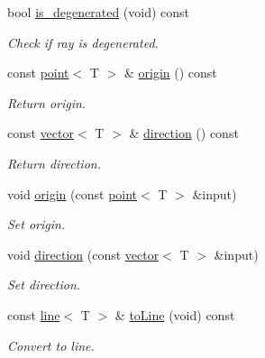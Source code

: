\begin{DoxyCompactItemize}
\mbox{\label{classddd_1_1ray_a1e7177e2e7cf15e8c1ec3a0631f8b583}} 
bool \hyperlink{classddd_1_1ray_a1e7177e2e7cf15e8c1ec3a0631f8b583}{is\+\_\+degenerated} (void) const
\begin{DoxyCompactList}\small\item\em Check if ray is degenerated. \end{DoxyCompactList}\item 
\mbox{\label{classddd_1_1ray_a92ad567ccc11d6d2bb9faa66cefbb9ca}} 
const \hyperlink{classddd_1_1point}{point}$<$ T $>$ \& \hyperlink{classddd_1_1ray_a92ad567ccc11d6d2bb9faa66cefbb9ca}{origin} () const
\begin{DoxyCompactList}\small\item\em Return origin. \end{DoxyCompactList}\item 
\mbox{\label{classddd_1_1ray_a8c6a38d8e1fcda4a44791ad17c99866e}} 
const \hyperlink{classddd_1_1vector}{vector}$<$ T $>$ \& \hyperlink{classddd_1_1ray_a8c6a38d8e1fcda4a44791ad17c99866e}{direction} () const
\begin{DoxyCompactList}\small\item\em Return direction. \end{DoxyCompactList}\item 
void \hyperlink{classddd_1_1ray_ac7a05d23b571b8e60ab9b25e53a8962f}{origin} (const \hyperlink{classddd_1_1point}{point}$<$ T $>$ \&input)
\begin{DoxyCompactList}\small\item\em Set origin. \end{DoxyCompactList}\item 
void \hyperlink{classddd_1_1ray_a52a945e00576b41d9e42a221a26aee14}{direction} (const \hyperlink{classddd_1_1vector}{vector}$<$ T $>$ \&input)
\begin{DoxyCompactList}\small\item\em Set direction. \end{DoxyCompactList}\item 
\mbox{\label{classddd_1_1ray_a407808f80ae5b3ac9d3ef7f35ff4d671}} 
const \hyperlink{classddd_1_1line}{line}$<$ T $>$ \& \hyperlink{classddd_1_1ray_a407808f80ae5b3ac9d3ef7f35ff4d671}{to\+Line} (void) const
\begin{DoxyCompactList}\small\item\em Convert to line. \end{DoxyCompactList}\item 

\end{DoxyCompactItemize}
